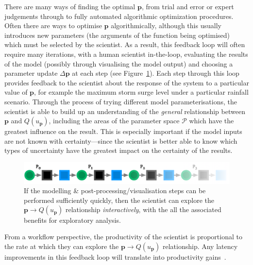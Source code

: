 \documentclass[a4paper,fontsize=12pt]{scrartcl}
\begin{document}
There are many ways of finding the optimal $\mathbf{p}$, from trial
and error or expert judgements through to fully automated algorithmic
optimization procedures. Often there are ways to optimise $\mathbf{p}$
algorithmically, although this usually introduces new parameters (the
arguments of the function being optimised) which must be selected by the
scientist. As a result, this feedback loop will often require many
iterations, with a human scientist in-the-loop, evaluating the results
of the model (possibly through visualising the model output) and
choosing a parameter update $\Delta\mathbf{p}$ at each step (see
Figure~\ref{fig:unrolled-fb-loop}). Each step through this loop
provides feedback to the scientist about the response of the system to
a particular value of $\mathbf{p}$, for example the maximum storm
surge level under a particular rainfall scenario. Through the process
of trying different model parameterisations, the scientist is able to
build up an understanding of the \emph{general} relationship between
$\mathbf{p}$ and $Q(u_{\mathbf{p}})$, including the areas of the
parameter space $\mathcal{P}$ which have the greatest influence on the
result. This is especially important if the model inputs are not known
with certainty---since the scientist is better able to know which
types of uncertainty have the greatest impact on the certainty of the
results.

\begin{figure}
  \centering
  \includegraphics[width=\textwidth]{figures/unrolled-fb-loop.pdf}
  \caption{If the modelling \& post-processing/visualisation steps can
    be performed sufficiently quickly, then the scientist can explore
    the $\mathbf{p} \rightarrow Q(u_{\mathbf{p}})$ relationship
    \emph{interactively}, with the all the associated benefits for
    exploratory analysis.}
  \label{fig:unrolled-fb-loop}
\end{figure}

From a workflow perspective, the productivity of the scientist is
proportional to the rate at which they can explore the
$\mathbf{p} \rightarrow Q(u_{\mathbf{p}})$ relationship. Any latency
improvements in this feedback loop will translate into productivity
gains~\parencite{liu_effects_2014}.
\end{document}
